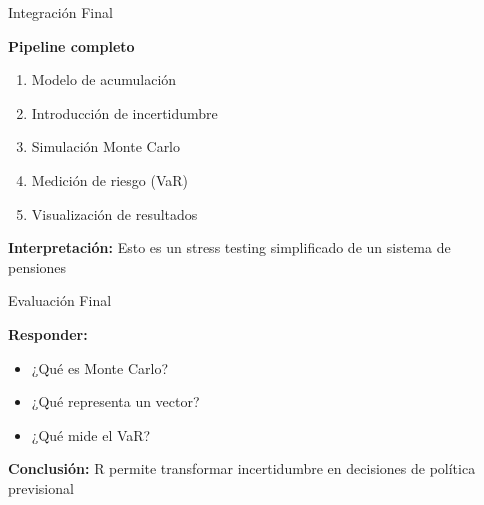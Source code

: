 \documentclass[10pt]{beamer}
\begin{document}
\begin{frame}{Integración Final}

\textbf{Pipeline completo}

\begin{enumerate}
\item Modelo de acumulación
\item Introducción de incertidumbre
\item Simulación Monte Carlo
\item Medición de riesgo (VaR)
\item Visualización de resultados
\end{enumerate}

\vspace{0.5cm}

\textbf{Interpretación:}
Esto es un stress testing simplificado de un sistema de pensiones

\end{frame}

\begin{frame}{Evaluación Final}

\textbf{Responder:}

\begin{itemize}
\item ¿Qué es Monte Carlo?
\item ¿Qué representa un vector?
\item ¿Qué mide el VaR?
\end{itemize}

\vspace{0.5cm}

\centering
\textbf{Conclusión:}  
R permite transformar incertidumbre en decisiones de política previsional

\end{frame}

\end{document}
